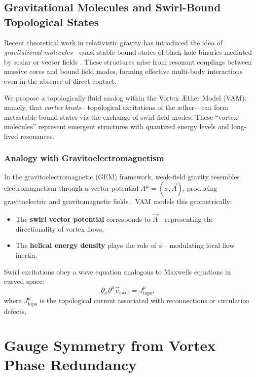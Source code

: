 \subsection{Gravitational Molecules and Swirl-Bound Topological States}

Recent theoretical work in relativistic gravity has introduced the idea of \textit{gravitational molecules}—quasi-stable bound states of black hole binaries mediated by scalar or vector fields \cite{baumann2023black}. These structures arise from resonant couplings between massive cores and bound field modes, forming effective multi-body interactions even in the absence of direct contact.

We propose a topologically fluid analog within the Vortex Æther Model (VAM): namely, that \textit{vortex knots}—topological excitations of the æther—can form metastable bound states via the exchange of swirl field modes. These ``vortex molecules'' represent emergent structures with quantized energy levels and long-lived resonances.

\subsubsection*{Analogy with Gravitoelectromagnetism}

In the gravitoelectromagnetic (GEM) framework, weak-field gravity resembles electromagnetism through a vector potential $A^\mu = (\phi, \vec{A})$, producing gravitoelectric and gravitomagnetic fields \cite{mashhoon2001gravito}. VAM models this geometrically:
\begin{itemize}
    \item The \textbf{swirl vector potential} corresponds to $\vec{A}$—representing the directionality of vortex flows,
    \item The \textbf{helical energy density} plays the role of $\phi$—modulating local flow inertia.
\end{itemize}

Swirl excitations obey a wave equation analogous to Maxwell\rqs s equations in curved space:
\begin{equation}
\partial_\mu \partial^\mu \vec{v}_\text{swirl} = J^\mu_{\text{topo}},
\end{equation}
where $J^\mu_{\text{topo}}$ is the topological current associated with reconnections or circulation defects.

\section*{Gauge Symmetry from Vortex Phase Redundancy}

